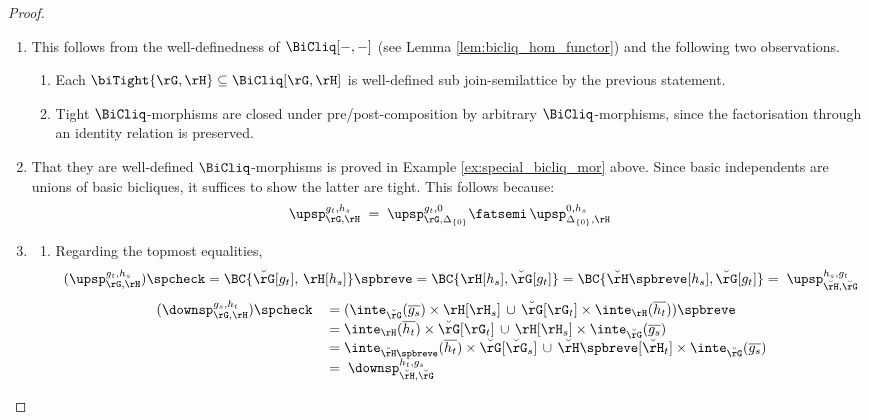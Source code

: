\documentclass{article}
\begin{document}
\begin{proof}
\begin{enumerate}
\item
This follows from the well-definedness of $\BiCliq[-,-]$ (see Lemma \ref{lem:bicliq_hom_functor}) and the following two observations.
\begin{enumerate}
\item
Each $\biTight{\rG,\rH} \subseteq \BiCliq[\rG,\rH]$ is well-defined sub join-semilattice by the previous statement.
\item
Tight $\BiCliq$-morphisms are closed under pre/post-composition by arbitrary $\BiCliq$-morphisms, since the factorisation through an identity relation is preserved.
\end{enumerate}

\item
That they are well-defined $\BiCliq$-morphisms is proved in Example \ref{ex:special_bicliq_mor} above. Since basic independents are unions of basic bicliques, it suffices to show the latter are tight. This follows because:
\[
\upsp_{\rG,\rH}^{g_t,h_s} \; 
= \; \upsp_{\rG,\Delta_{\{0\}}}^{g_t,0} \fatsemi\, \upsp_{\Delta_{\{0\}},\rH}^{0,h_s} 
\]

\item
\begin{enumerate}
\item
Regarding the topmost equalities,
\[
(\upsp_{\rG,\rH}^{g_t,h_s})\spcheck
= \BC{\breve{\rG}[g_t], \, \rH[h_s]}\spbreve
= \BC{\rH[h_s], \breve{\rG}[g_t]}
= \BC{\breve{\rH}\spbreve[h_s], \breve{\rG}[g_t]}
= \; \upsp_{\breve{\rH},\breve{\rG}}^{h_s,g_t}
\]
\[
\begin{tabular}{lll}
$(\downsp_{\rG,\rH}^{g_s,h_t})\spcheck$
&
$= (\inte_{\breve{\rG}}(\overline{g_s}) \times \rH[\rH_s] \,\cup\, \breve{\rG}[\rG_t] \times \inte_{\rH}(\overline{h_t}))\spbreve$
\\&
$= \inte_{\rH}(\overline{h_t}) \times \breve{\rG}[\rG_t] \, \cup \, \rH[\rH_s]\times\inte_{\breve{\rG}}(\overline{g_s})$
\\&
$= \inte_{\breve{\rH}\spbreve}(\overline{h_t}) \times \breve{\rG}[\breve{\rG}_s] \, \cup \, \breve{\rH}\spbreve[\breve{\rH}_t]\times\inte_{\breve{\rG}}(\overline{g_s})$
\\&
$= \; \downsp_{\breve{\rH},\breve{\rG}}^{h_t,g_s}$
\end{tabular}
\]


\end{enumerate}
\end{enumerate}
\end{proof}
\end{document}

